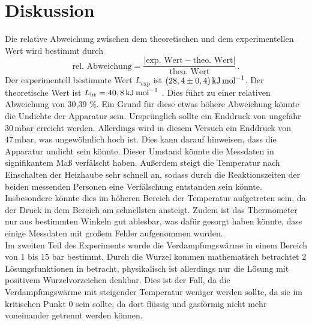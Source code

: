 \section{Diskussion}
\label{sec:Diskussion}
Die relative Abweichung zwischen dem theoretischen und dem experimentellen Wert wird bestimmt durch
$$\text{rel. Abweichung} = \frac{|\text{exp. Wert} - \text{theo. Wert}|}{\text{theo. Wert}}\,.$$
Der experimentell bestimmte Wert $L_{\text{exp}}$ ist $(28,4 \pm 0,4) \, \unit[per-mode=reciprocal]{\kilo\joule\per\mol}$. Der theoretische Wert ist 
$L_{\text{lit}} = 40,8 \, \unit[per-mode=reciprocal]{\kilo\joule\per\mol}$ \cite{L_Literatur}.
Dies führt zu einer relativen Abweichung von 30,39 \%. 
Ein Grund für diese etwas höhere Abweichung könnte die Undichte der Apparatur sein. Ursprünglich sollte ein Enddruck von ungefähr $30 \,\unit{\milli\bar}$ erreicht werden. Allerdings wird in diesem Versuch ein Enddruck von $47 \,\unit{\milli\bar}$,
was ungewöhnlich hoch ist. Dies kann darauf hinweisen, dass die Apparatur undicht sein könnte. 
Dieser Umstand könnte die Messdaten in signifikantem Maß verfälscht haben. Außerdem steigt die Temperatur nach Einschalten der Heizhaube sehr schnell an, sodass
durch die Reaktionszeiten der beiden messenden Personen eine Verfälschung entstanden sein könnte.
Insbesondere könnte dies im höheren Bereich der Temperatur aufgetreten sein, da der Druck in dem Bereich am schnellsten ansteigt.
Zudem ist das Thermometer nur aus bestimmten Winkeln gut ablesbar, 
was dafür gesorgt haben könnte, dass einige Messdaten mit großem Fehler aufgenommen wurden. \\
Im zweiten Teil des Experiments wurde die Verdampfungswärme in einem Bereich von 1 bis 15 bar bestimmt. Durch die Wurzel kommen mathematisch betrachtet 2 Lösungsfunktionen
in betracht, physikalisch ist allerdings nur die Lösung mit positivem Wurzelvorzeichen denkbar. Dies ist der Fall, da die Verdampfungswärme mit steigender Temperatur 
weniger werden sollte, da sie im kritischen Punkt 0 sein sollte, da dort flüssig und gasförmig nicht mehr voneinander getrennt werden können.





